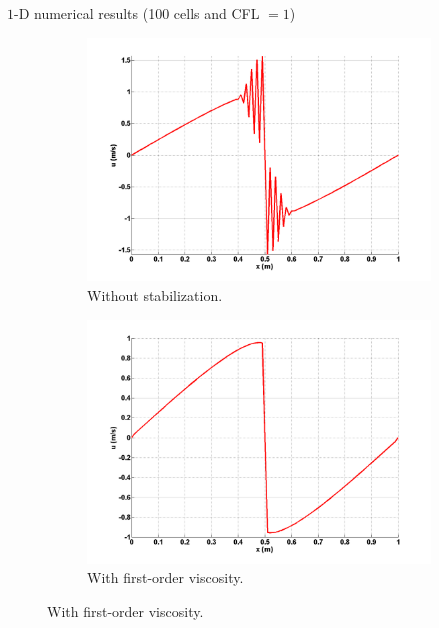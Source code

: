 \documentclass[xcolor=dvipsnames,10pt]{beamer}
\begin{document}
\begin{frame}{$1$-D numerical results (100 cells and CFL $=1$)}
\begin{figure}[H]
        \centering
        \begin{subfigure}[b]{0.37\textwidth}
                \centering
                \includegraphics[width=\textwidth]{../figures/1D_sol_free.png}
                \caption{Without stabilization.}
        \end{subfigure}%
        \begin{subfigure}[b]{0.37\textwidth}
                \centering
                \includegraphics[width=\textwidth]{../figures/1D_sol_fo.png}
                \caption{With first-order viscosity.}
        \end{subfigure}
        

\end{figure}
\end{frame}
\end{document}
